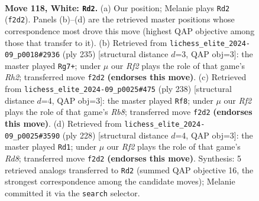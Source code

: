 \documentclass[11pt]{article}
\begin{document}
\clearpage

\begin{figure}[p]\centering
\begin{subfigure}{0.46\textwidth}\centering
\resizebox{\linewidth}{!}{%
\newchessgame
\chessboard[
  setfen={8/4k3/8/6K1/6P1/1r6/5R2/4N3 w - - 19 118},
  showmover=false,
  pgfstyle=straightmove, color=movearrow, markmove={f2-d2}
]}
\caption{}
\end{subfigure}\hfill
\begin{subfigure}{0.46\textwidth}\centering
\resizebox{\linewidth}{!}{%
\newchessgame
\chessboard[
  setfen={8/7r/1R6/8/5p2/5k2/8/6K1 b - - 35 118},
  showmover=false,
  pgfstyle=straightmove, color=movearrow, markmove={h7-g7}
]}
\caption{}
\end{subfigure}
\\[4pt]
\begin{subfigure}{0.46\textwidth}\centering
\resizebox{\linewidth}{!}{%
\newchessgame
\chessboard[
  setfen={1R6/7k/5K2/5P2/8/6r1/8/8 w - - 27 120},
  showmover=false,
  pgfstyle=straightmove, color=movearrow, markmove={b8-f8}
]}
\caption{}
\end{subfigure}\hfill
\begin{subfigure}{0.46\textwidth}\centering
\resizebox{\linewidth}{!}{%
\newchessgame
\chessboard[
  setfen={3R4/7k/5K2/5P2/8/6r1/8/8 w - - 25 115},
  showmover=false,
  pgfstyle=straightmove, color=movearrow, markmove={d8-d1}
]}
\caption{}
\end{subfigure}
\caption{\textbf{Move 118, White: \texttt{Rd2}.} (a) Our position; Melanie plays \texttt{Rd2} (\texttt{f2d2}). Panels (b)--(d) are the retrieved master positions whose correspondence most drove this move (highest QAP objective among those that transfer to it). (b) Retrieved from \texttt{lichess\_elite\_2024-09\_p0018\#2936} (ply 235) [structural distance $d$=3, QAP obj=3]: the master played \texttt{Rg7+}; under $\mu$ our \emph{Rf2} plays the role of that game's \emph{Rh2}; transferred move \texttt{f2d2} \textbf{(endorses this move)}. (c) Retrieved from \texttt{lichess\_elite\_2024-09\_p0025\#475} (ply 238) [structural distance $d$=4, QAP obj=3]: the master played \texttt{Rf8}; under $\mu$ our \emph{Rf2} plays the role of that game's \emph{Rb8}; transferred move \texttt{f2d2} \textbf{(endorses this move)}. (d) Retrieved from \texttt{lichess\_elite\_2024-09\_p0025\#3590} (ply 228) [structural distance $d$=4, QAP obj=3]: the master played \texttt{Rd1}; under $\mu$ our \emph{Rf2} plays the role of that game's \emph{Rd8}; transferred move \texttt{f2d2} \textbf{(endorses this move)}. Synthesis: 5 retrieved analogs transferred to \texttt{Rd2} (summed QAP objective 16, the strongest correspondence among the candidate moves); Melanie committed it via the \texttt{search} selector.}
\label{fig:thought-m234}
\end{figure}
\end{document}
